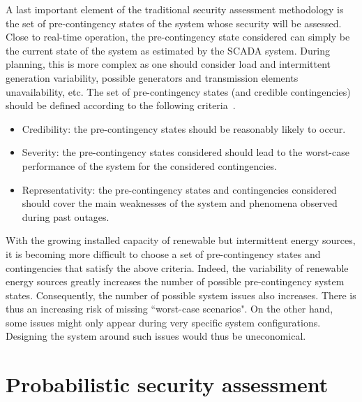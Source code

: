 A last important element of the traditional security assessment methodology is the set of pre-contingency states of the system whose security will be assessed. Close to real-time operation, the pre-contingency state considered can simply be the current state of the system as estimated by the SCADA system. During planning, this is more complex as one should consider load and intermittent generation variability, possible generators and transmission elements unavailability, etc. The set of pre-contingency states (and credible contingencies) should be defined according to the following criteria~\cite{CIGREreviewOfTools}.

\begin{itemize}
    \item Credibility: the pre-contingency states should be reasonably likely to occur.
    \item Severity: the pre-contingency states considered should lead to the worst-case performance of the system for the considered contingencies.
    \item Representativity: the pre-contingency states and contingencies considered should cover the main weaknesses of the system and phenomena observed during past outages.
\end{itemize}

With the growing installed capacity of renewable but intermittent energy sources, it is becoming more difficult to choose a set of pre-contingency states and contingencies that satisfy the above criteria. Indeed, the variability of renewable energy sources greatly increases the number of possible pre-contingency system states. Consequently, the number of possible system issues also increases. There is thus an increasing risk of missing ``worst-case scenarios". On the other hand, some issues might only appear during very specific system configurations. Designing the system around such issues would thus be uneconomical.


\section{Probabilistic security assessment}
\label{sec:probabilisticSecurity}

